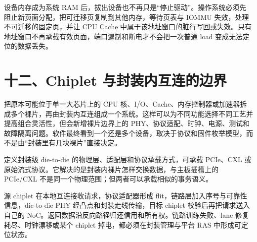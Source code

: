 设备内存成为系统 RAM 后，拔出设备也不再只是“停止驱动”。操作系统必须先阻止新页面分配，把可迁移页复制到其他内存，等待页表与 IOMMU 失效，处理不可迁移的固定页，并让 CPU Cache 中属于该地址窗口的脏行写回或失效。只有地址窗口不再承载有效页面，端口遏制和断电才不会把一次普通 load 变成无法定位的数据丢失。

\section{十二、Chiplet 与封装内互连的边界}

 把原本可能位于单一大芯片上的 CPU 核、I/O、Cache、内存控制器或加速器拆成多个裸片，再由封装内互连组成一个系统。这样可以为不同功能选择不同工艺并提高组合灵活性，但会新增裸片边界上的 PHY、协议适配、时钟、电源、测试和故障隔离问题。软件最终看到一个还是多个设备，取决于协议和固件枚举模型，而不是由“封装里有几块裸片”直接决定。

 定义封装级 die-to-die 的物理层、适配层和协议承载方式，可承载 PCIe、CXL 或原始流式协议。它解决的是封装内裸片怎样交换数据，与主板插槽上的 PCIe/CXL 不是同一个物理范围；但两者可以承载相似的事务语义。\cite{ucie-specs}

源 chiplet 在本地互连接收请求，协议适配器形成 flit，链路层加入序号与可靠性信息，die-to-die PHY 经凸点和封装走线传输，目标 chiplet 校验后再把请求送入自己的 NoC。返回数据沿反向路径归还信用和所有权。链路训练失败、lane 修复耗尽、时钟漂移或某个 chiplet 掉电，都必须在封装管理与平台 RAS 中形成可定位状态。


